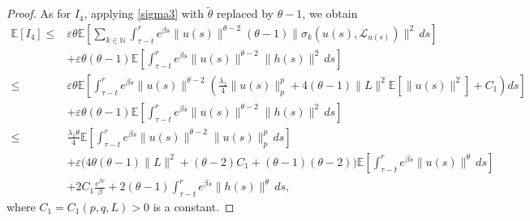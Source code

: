 \documentclass[11pt]{article}
\numberwithin{equation}{section}
\theoremstyle{plain}
\begin{document}
\begin{proof}
  
As for $I_4$, applying \eqref{sigma3} with $\tilde{\theta}$ replaced by $\theta-1$, we obtain
 \begin{align}\label{moment_h3}
 	\mathbb{E}[I_4]
 \le & \varepsilon \theta
          \mathbb{E}
                \left[ \sum_{k \in \mathbb{N}}
                            	\int_{\tau-t}^{r}
 	                                 e^{\beta s} \|u(s)\|^{\theta-2} (\theta-1)
                                	\| \sigma_k(u(s), \mathcal{L}_{u(s)}) \|^2 \, ds
 	            \right]   \nonumber\\
 	  & + \varepsilon \theta(\theta-1)
             \mathbb{E}
                   \left[ \int_{\tau-t}^{r}
                          	    e^{\beta s} \|u(s)\|^{\theta-2} \|h(s)\|^2 \, ds
 	               \right]  \nonumber\\
 \le & \varepsilon \theta
       	 \mathbb{E}
       	        \left[ \int_{\tau-t}^{r}
 	                         e^{\beta s} \|u(s)\|^{\theta-2}
 	                        \left( \frac{\lambda_1}{4} \|u(s)\|_{p}^{p}
 	                                  + 4(\theta-1)\|L\|^2 
 	                                      \mathbb{E} \left[ \|u(s)\|^2 \right] 
 	                                  + C_1
 	                       \right) ds
 	             \right]  \nonumber\\
 	   & + \varepsilon \theta(\theta-1)
 	          \mathbb{E}
 	                \left[ \int_{\tau-t}^{r}
 	                             e^{\beta s} \|u(s)\|^{\theta-2} \|h(s)\|^2 \, ds
 	                \right]   \nonumber\\
 \le & \frac{\lambda_1 \theta}{4}
           	\mathbb{E}
           	      \left[ \int_{\tau-t}^{r}
                             	e^{\beta s} \|u(s)\|^{\theta-2} \|u(s)\|_{p}^{p} \, ds
 	              \right]   \nonumber\\
 	     & + \varepsilon
 	            \Big( 4 \theta (\theta-1) \|L\|^2
 	                      + (\theta-2) C_1 
 	                      + (\theta-1)(\theta-2)
 	           \Big)
 	           \mathbb{E}
 	                  \left[ \int_{\tau-t}^{r}
 	                                e^{\beta s} \|u(s)\|^{\theta} \, ds
               	      \right]   \nonumber\\
 	     & + 2 C_1  \frac{e^{\beta r}}{\beta}
 	         + 2(\theta-1)
 	             \int_{\tau-t}^{r}
 	                 e^{\beta s} \|h(s)\|^{\theta} \, ds ,
 \end{align}
 where $C_1=C_1(p,q, L)>0$ is 
 a constant.
 

\end{proof}
\end{document}
